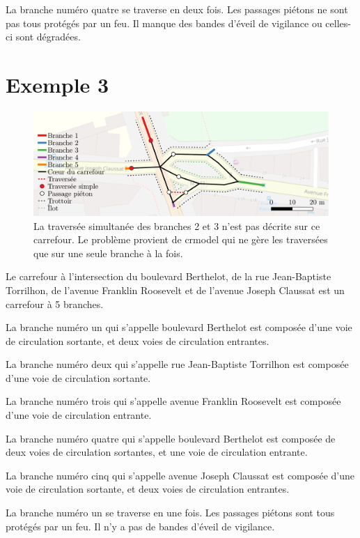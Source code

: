 \begin{appendix}
La branche numéro quatre se traverse en deux fois. Les passages piétons ne sont pas tous protégés par un feu. Il manque des bandes d'éveil de vigilance ou celles-ci sont dégradées.

\newpage
\section*{Exemple 3}

\begin{figure}[ht]
    \centering
    \includegraphics[width=\textwidth]{images/annexes/carrefour_manon.pdf}
    \caption{La traversée simultanée des branches 2 et 3 n'est pas décrite sur ce carrefour. Le problème provient de crmodel qui ne gère les traversées que sur une seule branche à la fois.}
    \label{fig:exemple3}
\end{figure}

Le carrefour à l'intersection du boulevard Berthelot, de la rue Jean-Baptiste Torrilhon, de l'avenue Franklin Roosevelt et de l'avenue Joseph Claussat est un carrefour à 5 branches.

\newpar{}

La branche numéro un qui s'appelle boulevard Berthelot est composée d'une voie de circulation sortante, et deux voies de circulation entrantes.

La branche numéro deux qui s'appelle rue Jean-Baptiste Torrilhon est composée d'une voie de circulation sortante.

La branche numéro trois qui s'appelle avenue Franklin Roosevelt est composée d'une voie de circulation entrante.

La branche numéro quatre qui s'appelle boulevard Berthelot est composée de deux voies de circulation sortantes, et une voie de circulation entrante.

La branche numéro cinq qui s'appelle avenue Joseph Claussat est composée d'une voie de circulation sortante, et deux voies de circulation entrantes.

\newpar{}

La branche numéro un se traverse en une fois. Les passages piétons sont tous protégés par un feu. Il n'y a pas de bandes d'éveil de vigilance.


\end{appendix}
